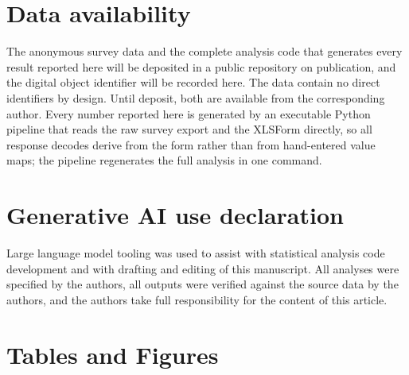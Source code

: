 \documentclass[12pt]{article}
\begin{document}
\section*{Data availability}
The anonymous survey data and the complete analysis code that generates every result reported here will
be deposited in a public repository on publication, and the digital object identifier will be recorded
here. The data contain no direct identifiers by design. Until deposit, both are available from the
corresponding author. Every number reported here is generated by an executable Python pipeline that reads
the raw survey export and the XLSForm directly, so all response decodes derive from the form rather than
from hand-entered value maps; the pipeline regenerates the full analysis in one command.

\section*{Generative AI use declaration}
Large language model tooling was used to assist with statistical analysis code development and with
drafting and editing of this manuscript. All analyses were specified by the authors, all outputs were
verified against the source data by the authors, and the authors take full responsibility for the content
of this article.



\clearpage

\section*{Tables and Figures}
\end{document}
